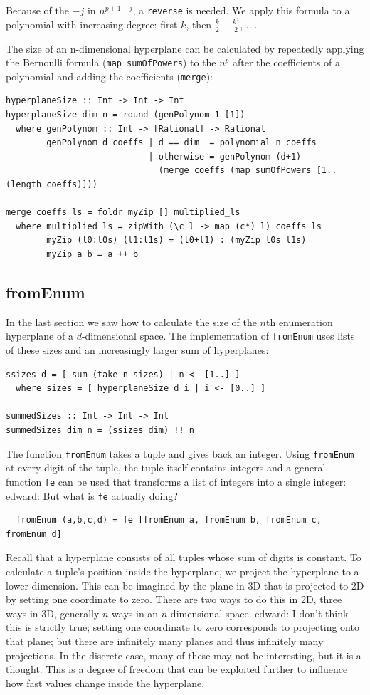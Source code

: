 \documentclass{tmr}
\newcommand{\authornote}[3]{{\color{#2} {\sc #1}: #3}}
\newcommand\bay[1]{\authornote{edward}{blue}{#1}}
\begin{document}
Because of the $-j$ in $n^{p+1-j}$, a \verb|reverse| is needed.
We apply this formula to a polynomial with increasing degree: first $k$, then $\frac{k}{2} + \frac{k^2}{2}$, ....

The size of an n-dimensional hyperplane can be calculated by repeatedly applying the Bernoulli formula (\verb|map sumOfPowers|) to the $n^p$ after the coefficients of a polynomial and adding the coefficients (\verb|merge|):

\small
\begin{Verbatim}
hyperplaneSize :: Int -> Int -> Int
hyperplaneSize dim n = round (genPolynom 1 [1])
  where genPolynom :: Int -> [Rational] -> Rational
        genPolynom d coeffs | d == dim  = polynomial n coeffs
                            | otherwise = genPolynom (d+1)
                              (merge coeffs (map sumOfPowers [1..(length coeffs)]))

merge coeffs ls = foldr myZip [] multiplied_ls
  where multiplied_ls = zipWith (\c l -> map (c*) l) coeffs ls
        myZip (l0:l0s) (l1:l1s) = (l0+l1) : (myZip l0s l1s)
        myZip a b = a ++ b
\end{Verbatim}

\subsection{fromEnum}
In the last section we saw how to calculate the size of the $n$th enumeration hyperplane of a $d$-dimensional space. The implementation of \verb|fromEnum| uses lists of these sizes and an increasingly larger sum of hyperplanes:

\begin{Verbatim}
ssizes d = [ sum (take n sizes) | n <- [1..] ]
  where sizes = [ hyperplaneSize d i | i <- [0..] ]

summedSizes :: Int -> Int -> Int
summedSizes dim n = (ssizes dim) !! n
\end{Verbatim}
The function \verb|fromEnum| takes a tuple and gives back an integer. Using \verb|fromEnum| at every digit of the tuple, the tuple itself contains integers and a general function \verb|fe| can be used that transforms a list of integers into a single integer: \bay{But what is \verb|fe| actually doing?}

\begin{Verbatim}
  fromEnum (a,b,c,d) = fe [fromEnum a, fromEnum b, fromEnum c, fromEnum d]
\end{Verbatim}

Recall that a hyperplane consists of all tuples whose sum of digits is constant. To calculate a tuple's position inside the hyperplane, we project the hyperplane to a lower dimension. This can be imagined by the plane in 3D that is projected to 2D by setting one coordinate to zero. There are two ways to do this in 2D, three ways in 3D, generally $n$ ways in an $n$-dimensional space. \bay{I don't think this is strictly true; setting one coordinate to zero corresponds to projecting onto that plane; but there are infinitely many planes and thus infinitely many projections.  In the discrete case, many of these may not be interesting, but it is a thought.} This is a degree of freedom that can be exploited further to influence how fast values change inside the hyperplane.
\end{document}
